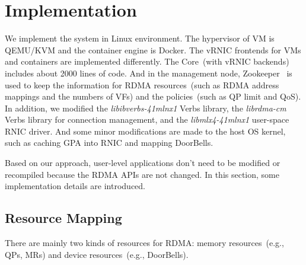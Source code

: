 \section{Implementation} \label{impl}
We implement the \sys system in Linux environment. The hypervisor of VM is QEMU/KVM and the container engine is Docker. The vRNIC frontends for VMs and containers are implemented differently. The \sys Core~(with vRNIC backends) includes about 2000 lines of code.
And in the management node, Zookeeper~\cite{zookeeper} is used to keep the information for RDMA resources~(such as RDMA address mappings and the numbers of VFs) and the policies~(such as QP limit and QoS).
In addition, we modified the \textit{libibverbs-41mlnx1} Verbs library, the \textit{librdma-cm} Verbs library for connection management, and the \textit{libmlx4-41mlnx1} user-space RNIC driver.
And some minor modifications are made to the host OS kernel, such as caching GPA into RNIC and mapping DoorBells.

Based on our approach, user-level applications don't need to be modified or recompiled because the RDMA APIs are not changed. In this section, some implementation details are introduced.

\subsection{Resource Mapping}

There are mainly two kinds of resources for RDMA: memory resources~(e.g., QPs, MRs) and device resources~(e.g., DoorBells). 


